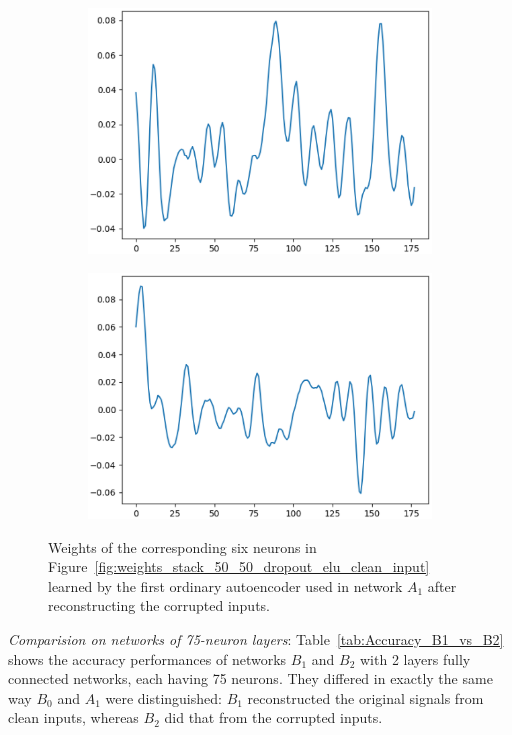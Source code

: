 \documentclass[12pt]{article}
\begin{document}
\begin{figure}
\begin{subfigure}{.5\textwidth}
  \centering
  \includegraphics[width=.8\linewidth]{figures/stack_50_50_dropout_elu/weights_neuron_4.eps}
\end{subfigure}
\begin{subfigure}{.5\textwidth}
  \centering
  \includegraphics[width=.8\linewidth]{figures/stack_50_50_dropout_elu/weights_neuron_8.eps}
\end{subfigure}
\caption{Weights of the corresponding six neurons in Figure~\ref{fig:weights_stack_50_50_dropout_elu_clean_input} learned by the first ordinary autoencoder used in network $A_1$ after reconstructing the corrupted inputs.}
\label{fig:weights_stack_50_50_dropout_elu}
\end{figure}

\textit{Comparision on networks of 75-neuron layers}: Table~\ref{tab:Accuracy_B1_vs_B2} shows the accuracy performances of networks $B_1$ and $B_2$ with 2 layers fully connected networks, each having 75 neurons. They differed in exactly the same way $B_0$ and $A_1$ were distinguished: $B_1$ reconstructed the original signals from clean inputs, whereas $B_2$ did that from the corrupted inputs.
\end{document}
